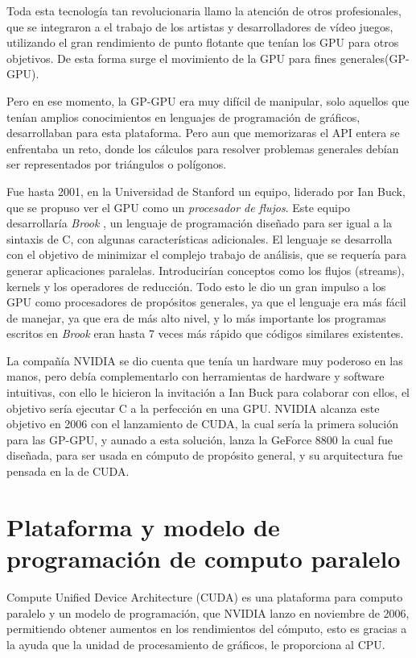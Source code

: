 Toda esta tecnología tan revolucionaria llamo la atención de otros profesionales, que se integraron a el trabajo de los artistas y desarrolladores de vídeo juegos, utilizando el gran rendimiento de punto flotante que tenían los GPU para otros objetivos. De esta forma surge el movimiento de la GPU para fines generales(GP-GPU).

Pero en ese momento, la GP-GPU era muy difícil de manipular, solo aquellos que tenían amplios conocimientos en lenguajes de programación de gráficos, desarrollaban para esta plataforma. Pero aun que memorizaras el API entera se enfrentaba un reto, donde los cálculos para resolver problemas generales debían ser representados por triángulos o polígonos.

Fue hasta 2001, en la Universidad de Stanford un equipo, liderado por Ian Buck, que se propuso ver el GPU como un  \textit{procesador de flujos}. Este equipo desarrollaría \textit{Brook} \cite{Buck2001}, un lenguaje de programación diseñado para ser igual a la sintaxis de C, con algunas características adicionales. El lenguaje se desarrolla con el objetivo de minimizar el complejo trabajo de análisis, que se requería para generar aplicaciones paralelas. Introducirían conceptos como los flujos (streams), kernels y los operadores de reducción. Todo esto le dio un gran impulso a los GPU como procesadores de propósitos generales, ya que el lenguaje era más fácil de manejar, ya que era de más alto nivel, y lo más importante los programas escritos en \textit{Brook} eran hasta 7 veces más rápido que códigos similares existentes.

La compañía NVIDIA se dio cuenta que tenía un hardware muy poderoso en las manos, pero debía complementarlo con herramientas de hardware y software intuitivas, con ello le hicieron la invitación a Ian Buck para colaborar con ellos, el objetivo sería ejecutar C a la perfección en una GPU. NVIDIA alcanza este objetivo en 2006 con el lanzamiento de CUDA, la cual sería la primera solución para las GP-GPU, y aunado a esta solución, lanza la GeForce 8800 la cual fue diseñada, para ser usada en cómputo de propósito general, y su arquitectura fue pensada en la de CUDA. 


\section{Plataforma y modelo de programación de computo paralelo}
Compute Unified Device Architecture (CUDA) es una plataforma para computo paralelo y un modelo de programación, que NVIDIA lanzo en noviembre de 2006, permitiendo obtener aumentos en los rendimientos del cómputo, esto es gracias a la ayuda que la unidad de procesamiento de gráficos, le proporciona al CPU. 

